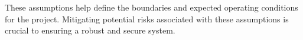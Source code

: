 \documentclass{article}
\begin{document}
These assumptions help define the boundaries and expected operating conditions for the project. Mitigating potential risks associated with these assumptions is crucial to ensuring a robust and secure system.

\newpage

\end{document}
